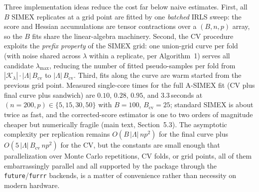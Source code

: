 Three implementation ideas reduce the cost far below naive estimates.
First, all $B$ SIMEX replicates at a grid point are fitted by one
\emph{batched} IRLS sweep: the score and Hessian accumulations are
tensor contractions over a $(B,n,p)$ array, so the $B$ fits share the
linear-algebra machinery. Second, the CV procedure exploits the
\emph{prefix property} of the SIMEX grid: one union-grid curve per
fold (with noise shared across $\lambda$ within a replicate, per
Algorithm~1) serves all candidate $\lambda_{\max}$, reducing the
number of fitted pseudo-samples per fold from
$|\mathcal K_\lambda|\cdot|\Lambda|\,B_{\mathrm{cv}}$ to
$|\Lambda|\,B_{\mathrm{cv}}$. Third, fits along the curve are warm
started from the previous grid point. Measured single-core times for
the full A-SIMEX fit (CV plus final curve plus sandwich) are $0.10$,
$0.28$, $0.95$, and $3.3$\,seconds at $(n{=}200,p)\in
\{5,15,30,50\}$ with $B=100$, $B_{\mathrm{cv}}=25$; standard SIMEX is
about twice as fast, and the corrected-score estimator is one to two
orders of magnitude cheaper but numerically fragile
(main text, Section~5.3). The asymptotic complexity per replication
remains $O(B\,|\Lambda|\,n p^2)$ for the final curve plus
$O(5\,|\Lambda|\,B_{\mathrm{cv}}\,n p^2)$ for the CV, but the
constants are small enough that parallelization over Monte Carlo
repetitions, CV folds, or grid points, all of them embarrassingly
parallel and all supported by the package through the
\texttt{future}/\texttt{furrr} backends, is a matter of convenience
rather than necessity on modern hardware.


